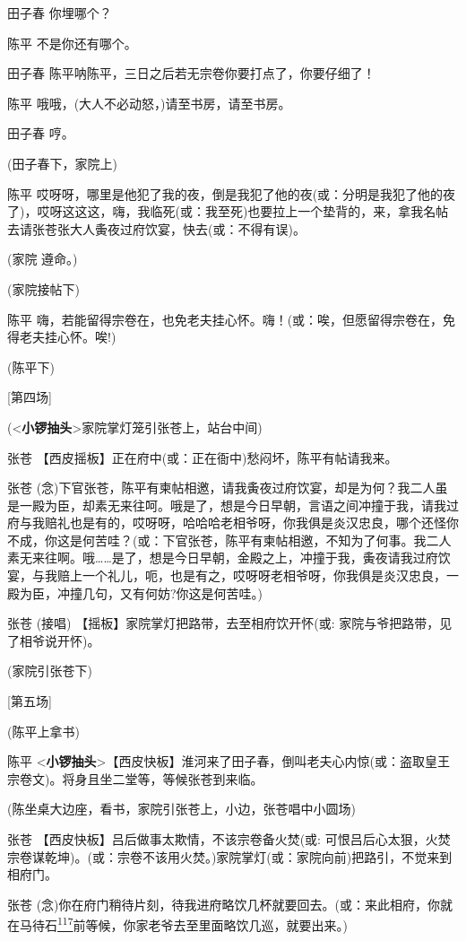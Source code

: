 田子春 你埋哪个？

陈平 不是你还有哪个。

田子春 陈平呐陈平，三日之后若无宗卷你要打点了，你要仔细了！

陈平 哦哦，(大人不必动怒，)请至书房，请至书房。

田子春 哼。

(田子春下，家院上)

陈平
哎呀呀，哪里是他犯了我的夜，倒是我犯了他的夜(或：分明是我犯了他的夜了)，哎呀这这这，嗨，我临死(或：我至死)也要拉上一个垫背的，来，拿我名帖去请张苍张大人夤夜过府饮宴，快去(或：不得有误)。

(家院 遵命。)

(家院接帖下)

陈平
嗨，若能留得宗卷在，也免老夫挂心怀。嗨！(或：唉，但愿留得宗卷在，免得老夫挂心怀。唉!)

(陈平下)

{[}第四场{]}

(\textless{}\textbf{小锣抽头}\textgreater{}家院掌灯笼引张苍上，站台中间)

张苍 【西皮摇板】正在府中(或：正在衙中)愁闷坏，陈平有帖请我来。

张苍
(念)下官张苍，陈平有柬帖相邀，请我夤夜过府饮宴，却是为何？我二人虽是一殿为臣，却素无来往呵。哦是了，想是今日早朝，言语之间冲撞于我，请我过府与我赔礼也是有的，哎呀呀，哈哈哈老相爷呀，你我俱是炎汉忠良，哪个还怪你不成，你这是何苦哇？(或：下官张苍，陈平有柬帖相邀，不知为了何事。我二人素无来往啊。哦\ldots{}\ldots{}是了，想是今日早朝，金殿之上，冲撞于我，夤夜请我过府饮宴，与我赔上一个礼儿，呃，也是有之，哎呀呀老相爷呀，你我俱是炎汉忠良，一殿为臣，冲撞几句，又有何妨?你这是何苦哇。)

张苍 (接唱) 【摇板】家院掌灯把路带，去至相府饮开怀(或:
家院与爷把路带，见了相爷说开怀)。

(家院引张苍下)

{[}第五场{]}

(陈平上拿书)

陈平
\textless{}\textbf{小锣抽头}\textgreater{}【西皮快板】淮河来了田子春，倒叫老夫心内惊(或：盗取皇王宗卷文)。将身且坐二堂等，等候张苍到来临。

(陈坐桌大边座，看书，家院引张苍上，小边，张苍唱中小圆场)

张苍 【西皮快板】吕后做事太欺情，不该宗卷备火焚(或:
可恨吕后心太狠，火焚宗卷谋乾坤)。(或：宗卷不该用火焚。)家院掌灯(或：家院向前)把路引，不觉来到相府门。

张苍
(念)你在府门稍待片刻，待我进府略饮几杯就要回去。(或：来此相府，你就在马待石\protect\hyperlink{fn117}{\textsuperscript{117}}前等候，你家老爷去至里面略饮几巡，就要出来。)

